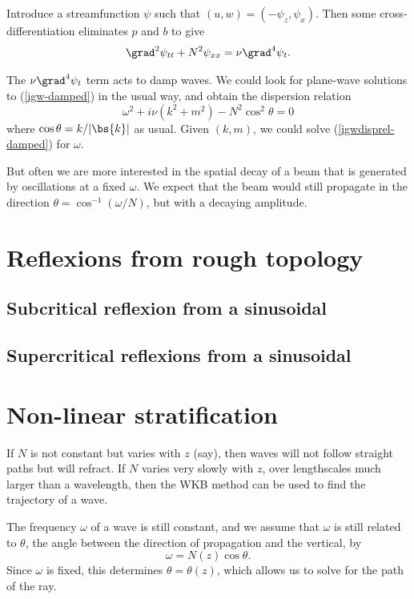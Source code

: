 Introduce a streamfunction $\psi$ such that $(u,w) = (-\psi_z, \psi_x)$. Then some cross-differentiation eliminates $p$ and $b$ to give
\begin{equation}
	\grad^2 \psi_{tt} + N^2 \psi_{xx} = \nu\grad^4 \psi_t.
	\label{igw-damped}
\end{equation} 

The $\nu\grad^4\psi_t$ term acts to damp waves. We could look for plane-wave solutions to (\ref{igw-damped}) in the usual way, and obtain the dispersion relation
\begin{equation}
	\omega^2 + i\nu(k^2+m^2) - N^2\cos^2\theta = 0
	\label{igwdisprel-damped}
\end{equation}
where $\cos\theta = k/|\bs{k}|$ as usual. Given $(k,m)$, we could solve (\ref{igwdisprel-damped}) for $\omega$. 

But often we are more interested in the spatial decay of a beam that is generated by oscillations at a fixed $\omega$. We expect that the beam would still propagate in the direction $\theta = \cos^{-1} (\omega/N)$, but with a decaying amplitude.

\section{Reflexions from rough topology}

\subsection{Subcritical reflexion from a sinusoidal}
\subsection{Supercritical reflexions from a sinusoidal}

\section{Non-linear stratification}

If $N$ is not constant but varies with $z$ (say), then waves will not follow straight paths but will refract. If $N$ varies very slowly with $z$, over lengthscales much larger than a wavelength, then the WKB method can be used to find the trajectory of a wave. 

The frequency $\omega$ of a wave is still constant, and we assume that $\omega$ is still related to $\theta$, the angle between the direction of propagation and the vertical, by
\begin{equation}
 \omega = N(z)\cos\theta.
\end{equation}
Since $\omega$ is fixed, this determines $\theta = \theta(z)$, which allows us to solve for the path of the ray.

